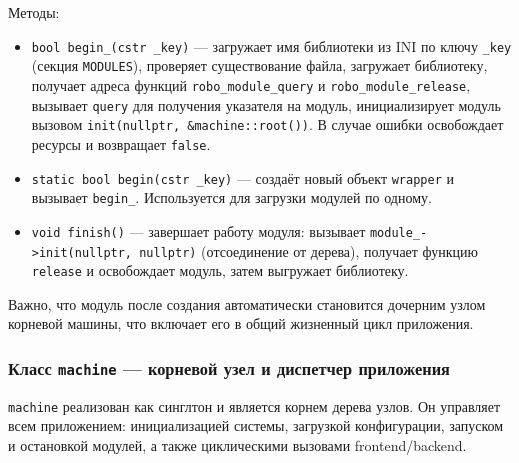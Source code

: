 \documentclass[a4paper,12pt]{article}
\begin{document}
Методы:
\begin{itemize}
    \item \texttt{bool begin\_(cstr \_key)} — загружает имя библиотеки из INI по ключу \texttt{\_key} (секция \texttt{MODULES}), проверяет существование файла, загружает библиотеку, получает адреса функций \texttt{robo\_module\_query} и \texttt{robo\_module\_release}, вызывает \texttt{query} для получения указателя на модуль, инициализирует модуль вызовом \texttt{init(nullptr, \&machine::root())}. В случае ошибки освобождает ресурсы и возвращает \texttt{false}.
    \item \texttt{static bool begin(cstr \_key)} — создаёт новый объект \texttt{wrapper} и вызывает \texttt{begin\_}. Используется для загрузки модулей по одному.
    \item \texttt{void finish()} — завершает работу модуля: вызывает \texttt{module\_->init(nullptr, nullptr)} (отсоединение от дерева), получает функцию \texttt{release} и освобождает модуль, затем выгружает библиотеку.
\end{itemize}

Важно, что модуль после создания автоматически становится дочерним узлом корневой машины, что включает его в общий жизненный цикл приложения.

\subsubsection{Класс \texttt{machine} — корневой узел и диспетчер приложения}

\texttt{machine} реализован как синглтон и является корнем дерева узлов. Он управляет всем приложением: инициализацией системы, загрузкой конфигурации, запуском и остановкой модулей, а также циклическими вызовами frontend/backend.
\end{document}
